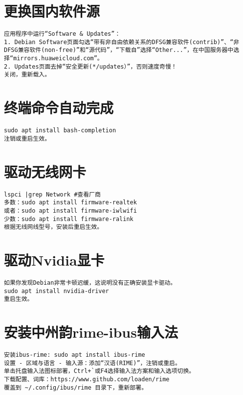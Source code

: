 \documentclass[a4paper,fontset=fandol,zihao=-4,linespread=1.2]{ctexbook}
\begin{document}
\section{更换国内软件源}
\begin{lstlisting}
应用程序中运行“Software & Updates”：
1. Debian Software页面勾选“带有非自由依赖关系的DFSG兼容软件(contrib)”、“非DFSG兼容软件(non-free)”和“源代码”，“下载自”选择“Other...”，在中国服务器中选择“mirrors.huaweicloud.com”。
2. Updates页面去掉“安全更新(*/updates）”，否则速度奇慢！
关闭，重新载入。
\end{lstlisting}

\section{终端命令自动完成}
\begin{lstlisting}
sudo apt install bash-completion
注销或重启生效。
\end{lstlisting}

\section{驱动无线网卡}
\begin{lstlisting}
lspci |grep Network #查看厂商
多数：sudo apt install firmware-realtek
或者：sudo apt install firmware-iwlwifi
少数：sudo apt install firmware-ralink
根据无线网线型号，安装后重启生效。
\end{lstlisting}

\section{驱动Nvidia显卡}
\begin{lstlisting}
如果你发现Debian非常卡顿迟缓，这说明没有正确安装显卡驱动。
sudo apt install nvidia-driver
重启生效。
\end{lstlisting}

\section{安装中州韵rime-ibus输入法}
\begin{lstlisting}
安装ibus-rime: sudo apt install ibus-rime
设置 - 区域与语言 - 输入源：添加“汉语(RIME)”，注销或重启。
单击托盘输入法图标部署，Ctrl+`或F4选择输入法方案和输入选项切换。
下载配置、词库：https://www.github.com/loaden/rime
覆盖到 ~/.config/ibus/rime 目录下，重新部署。
\end{lstlisting}
\end{document}
